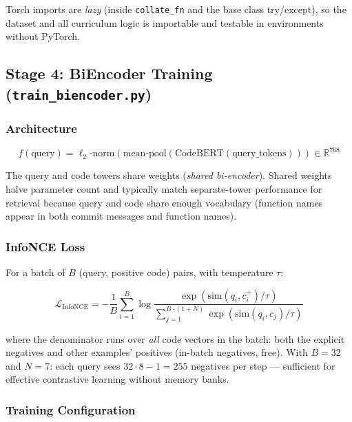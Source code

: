 \documentclass[11pt,a4paper]{article}
\begin{document}
Torch imports are \emph{lazy} (inside \texttt{collate\_fn} and the base class
try/except), so the dataset and all curriculum logic is importable and testable
in environments without PyTorch.

\subsection{Stage 4: BiEncoder Training (\texttt{train\_biencoder.py})}
\label{sec:biencoder}

\subsubsection{Architecture}

\begin{equation}
  f(\text{query}) = \ell_2\text{-norm}\!\left(\text{mean-pool}\!\left(\text{CodeBERT}(\text{query\_tokens})\right)\right) \in \mathbb{R}^{768}
\end{equation}

The query and code towers share weights (\emph{shared bi-encoder}).
Shared weights halve parameter count and typically match separate-tower
performance for retrieval because query and code share enough vocabulary
(function names appear in both commit messages and function names).

\subsubsection{InfoNCE Loss}

For a batch of $B$ (query, positive code) pairs, with temperature $\tau$:

\begin{equation}
  \mathcal{L}_{\text{InfoNCE}} = -\frac{1}{B} \sum_{i=1}^{B}
  \log \frac{\exp\!\left(\mathrm{sim}(q_i, c_i^+) / \tau\right)}
            {\sum_{j=1}^{B \cdot (1+N)} \exp\!\left(\mathrm{sim}(q_i, c_j) / \tau\right)}
\end{equation}

where the denominator runs over \emph{all} code vectors in the batch:
both the explicit negatives and other examples' positives (in-batch negatives,
free). With $B=32$ and $N=7$: each query sees
$32 \cdot 8 - 1 = 255$ negatives per step --- sufficient for effective
contrastive learning without memory banks.

\subsubsection{Training Configuration}
\end{document}
